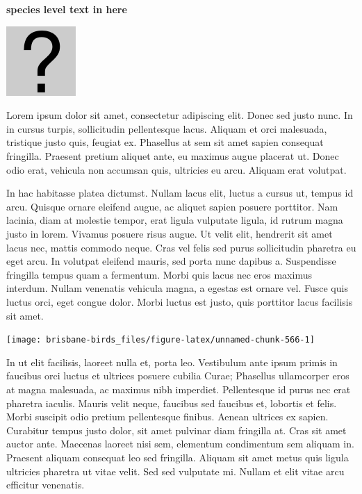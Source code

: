 \documentclass[]{book}
\let\origfigure\figure
\let\endorigfigure\endfigure
\renewenvironment{figure}[1][2] {
  \expandafter\origfigure\expandafter[H]
} {
  \endorigfigure
}
\begin{document}
\textbf{species level text in here}

\begin{figure}
\centering
\includegraphics{assets/missing.png}
\caption{No image for species}
\end{figure}

Lorem ipsum dolor sit amet, consectetur adipiscing elit. Donec sed justo
nunc. In in cursus turpis, sollicitudin pellentesque lacus. Aliquam et
orci malesuada, tristique justo quis, feugiat ex. Phasellus at sem sit
amet sapien consequat fringilla. Praesent pretium aliquet ante, eu
maximus augue placerat ut. Donec odio erat, vehicula non accumsan quis,
ultricies eu arcu. Aliquam erat volutpat.

In hac habitasse platea dictumst. Nullam lacus elit, luctus a cursus ut,
tempus id arcu. Quisque ornare eleifend augue, ac aliquet sapien posuere
porttitor. Nam lacinia, diam at molestie tempor, erat ligula vulputate
ligula, id rutrum magna justo in lorem. Vivamus posuere risus augue. Ut
velit elit, hendrerit sit amet lacus nec, mattis commodo neque. Cras vel
felis sed purus sollicitudin pharetra eu eget arcu. In volutpat eleifend
mauris, sed porta nunc dapibus a. Suspendisse fringilla tempus quam a
fermentum. Morbi quis lacus nec eros maximus interdum. Nullam venenatis
vehicula magna, a egestas est ornare vel. Fusce quis luctus orci, eget
congue dolor. Morbi luctus est justo, quis porttitor lacus facilisis sit
amet.

\begin{figure}
\texttt{[image: brisbane-birds\_files/figure-latex/unnamed-chunk-566-1]} \caption{insert figure caption}\label{fig:unnamed-chunk-566}
\end{figure}

In ut elit facilisis, laoreet nulla et, porta leo. Vestibulum ante ipsum
primis in faucibus orci luctus et ultrices posuere cubilia Curae;
Phasellus ullamcorper eros at magna malesuada, ac maximus nibh
imperdiet. Pellentesque id purus nec erat pharetra iaculis. Mauris velit
neque, faucibus sed faucibus et, lobortis et felis. Morbi suscipit odio
pretium pellentesque finibus. Aenean ultrices ex sapien. Curabitur
tempus justo dolor, sit amet pulvinar diam fringilla at. Cras sit amet
auctor ante. Maecenas laoreet nisi sem, elementum condimentum sem
aliquam in. Praesent aliquam consequat leo sed fringilla. Aliquam sit
amet metus quis ligula ultricies pharetra ut vitae velit. Sed sed
vulputate mi. Nullam et elit vitae arcu efficitur venenatis.
\end{document}
